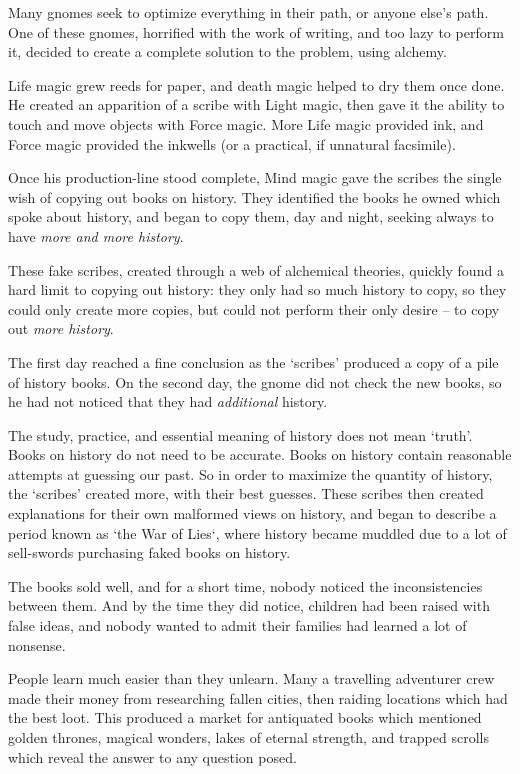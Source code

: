 \begin{multicols}{2}
\begin{exampletext}
  Many gnomes seek to optimize everything in their path, or anyone else's path.
  One of these gnomes, horrified with the work of writing, and too lazy to perform it, decided to create a complete solution to the problem, using alchemy.

  Life magic grew reeds for paper, and death magic helped to dry them once done.
  He created an apparition of a scribe with Light magic, then gave it the ability to touch and move objects with Force magic.
  More Life magic provided ink, and Force magic provided the inkwells (or a practical, if unnatural facsimile).

  Once his production-line stood complete, Mind magic gave the scribes the single wish of copying out books on history.
  They identified the books he owned which spoke about history, and began to copy them, day and night, seeking always to have \emph{more and more history}.

  These fake scribes, created through a web of alchemical theories, quickly found a hard limit to copying out history: they only had so much history to copy, so they could only create more copies, but could not perform their only desire -- to copy out \emph{more history}.

  The first day reached a fine conclusion as the `scribes' produced a copy of a pile of history books.
  On the second day, the gnome did not check the new books, so he had not noticed that they had \emph{additional} history.

  The study, practice, and essential meaning of history does not mean `truth'.
  Books on history do not need to be accurate.
  Books on history contain reasonable attempts at guessing our past.
  So in order to maximize the quantity of history, the `scribes' created more, with their best guesses.
  These scribes then created explanations for their own malformed views on history, and began to describe a period known as `the War of Lies`, where history became muddled due to a lot of sell-swords purchasing faked books on history.

  The books sold well, and for a short time, nobody noticed the inconsistencies between them.
  And by the time they did notice, children had been raised with false ideas, and nobody wanted to admit their families had learned a lot of nonsense.

  People learn much easier than they unlearn.
  \else
    Many a travelling adventurer crew made their money from researching fallen cities, then raiding locations which had the best loot.
    This produced a market for antiquated books which mentioned golden thrones, magical wonders, lakes of eternal strength, and trapped scrolls which reveal the answer to any question posed.


\end{exampletext}
\end{multicols}
